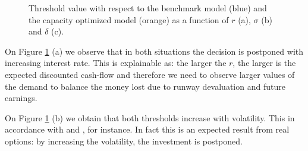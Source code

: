 \begin{figure}[!htb]
	\begin{subfigmatrix}{3}
	\end{subfigmatrix}
	\caption{Threshold value with respect to the benchmark model (blue) and the capacity optimized model (orange) as a function of $r$ (a), $\sigma$ (b)  and $\delta$ (c).}
	\label{fig:sigm}
\end{figure}
On Figure \ref{fig:sigm} (a) we observe that in both situations the decision is postponed with increasing interest rate. This is explainable as: the larger the $r$, the larger is the expected discounted cash-flow and therefore we need to observe larger values of the demand to balance the money lost due to runway devaluation and future earnings.

On Figure \ref{fig:sigm} (b) we obtain that both thresholds increase with volatility. This in accordance with \cite{hagspiel:cap} and \cite{rita}, for instance. In fact this is an expected result from real options: by increasing the volatility, the investment is postponed.

